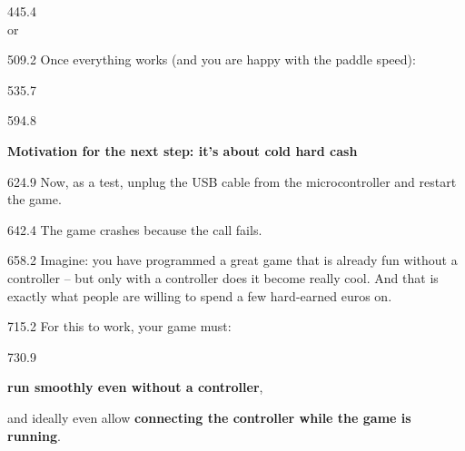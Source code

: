 \documentclass{aslab}
\begin{document}
\begin{region}[x=74.7,right=0,pitch=18.8]{445.4}
\\
or\\
\end{region}

\begin{region}{509.2}
Once everything works (and you are happy with the paddle speed):
\end{region}

\begin{region}[pitch=13.2]{535.7}
\\
\end{region}

\begin{region}{594.8}
{\fontsize{13bp}{15bp}\selectfont\bfseries\color{motivmagenta}Motivation for
the next step: it's about cold hard cash \par}
\end{region}

\begin{region}{624.9}
Now, as a test, unplug the USB cable from the microcontroller and restart the
game.
\end{region}

\begin{region}[pitch=15.8]{642.4}
 The game crashes because the call
 fails.
\end{region}

\begin{region}[pitch=13.15]{658.2}
Imagine: you have programmed a great game that is already fun without a
controller -- but only with a controller does it become really cool. And
that is exactly what people are willing to spend a few hard-earned euros on.
\end{region}

\begin{region}{715.2}
 For this to work, your game must:
\end{region}

\begin{region}[pitch=14.2]{730.9}
\begin{dashlist}
\item \textbf{run smoothly even without a controller},
\item[{\color{aslabblue}\fontsize{13.2bp}{12bp}\selectfont -}] and
  ideally even allow \textbf{connecting the controller while the game is
  running}.
\end{dashlist}
\end{region}
\end{document}

